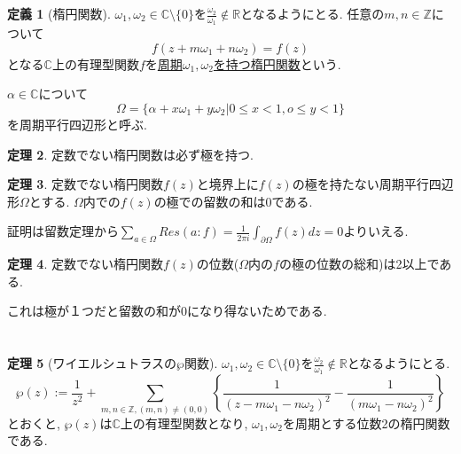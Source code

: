 \documentclass[dvipdfmx,a4paper,11pt]{article}
\newcommand{\R}{\mathbb{R}}
\newcommand{\Z}{\mathbb{Z}}
\newcommand{\C}{\mathbb{C}}
\theoremstyle{definition}
\newtheorem{thm}{定理}
\newtheorem{dfn}[thm]{定義}
\begin{document}
\begin{tcolorbox}[
    colback = white,
    colframe = green!35!black,
    fonttitle = \bfseries,
    breakable = true]
    \begin{dfn}[楕円関数]
    $\omega_{1}, \omega_{2} \in \C \setminus \{ 0\}$を$\frac{\omega_{2}}{\omega_{1}} \not \in \R$となるようにとる. 任意の$m,n \in \Z$について
    $$
    f(z + m\omega_{1} + n \omega_{2}) = f(z)
    $$
    となる$\C$上の有理型関数$f$を\underline{周期$\omega_{1}, \omega_{2}$を持つ楕円関数}という.
    
    $\alpha \in \C$について
    $$
    \Omega = \{\alpha + x \omega_1 + y \omega_2 | 0 \le x < 1, o \le y < 1 \}
    $$
    を周期平行四辺形と呼ぶ.
    \end{dfn}
\end{tcolorbox} 

\begin{tcolorbox}[
    colback = white,
    colframe = green!35!black,
    fonttitle = \bfseries,
    breakable = true]
    \begin{thm}
定数でない楕円関数は必ず極を持つ.
    \end{thm}
\end{tcolorbox} 


\begin{tcolorbox}[
    colback = white,
    colframe = green!35!black,
    fonttitle = \bfseries,
    breakable = true]
    \begin{thm}
定数でない楕円関数$f(z)$と境界上に$f(z)$の極を持たない周期平行四辺形$\Omega$とする. $\Omega$内での$f(z)$の極での留数の和は0である.
    \end{thm}
\end{tcolorbox} 
証明は留数定理から$ \sum_{a \in \Omega} Res(a : f) = \frac{1}{2 \pi i}\int_{\partial \Omega} f(z) dz = 0 $よりいえる. 

\begin{tcolorbox}[
    colback = white,
    colframe = green!35!black,
    fonttitle = \bfseries,
    breakable = true]
    \begin{thm}
定数でない楕円関数$f(z)$の位数($\Omega$内の$f$の極の位数の総和)は2以上である.
    \end{thm}
\end{tcolorbox} 
これは極が１つだと留数の和が0になり得ないためである.

\section{}
\begin{tcolorbox}[
    colback = white,
    colframe = green!35!black,
    fonttitle = \bfseries,
    breakable = true]
    \begin{thm}[ワイエルシュトラスの$\wp$関数]
    $\omega_{1}, \omega_{2} \in \C \setminus \{ 0\}$を$\frac{\omega_{2}}{\omega_{1}} \not \in \R$となるようにとる. 
    $$
\wp(z) := \frac{1}{z^2} + \sum_{m,n \in \Z , (m,n) \neq (0,0) }
\left\{ \frac{1}{(z - m \omega_1 - n \omega_2)^2}  - \frac{1}{( m \omega_1 - n \omega_2)^2}\right\}
    $$
とおくと, $\wp(z)$は$\C$上の有理型関数となり, $\omega_{1}, \omega_{2}$を周期とする位数2の楕円関数である. 
    \end{thm}
\end{tcolorbox} 
\end{document}
